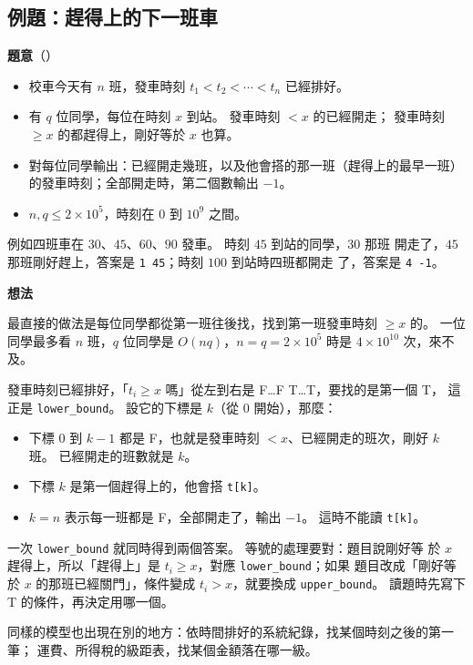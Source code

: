 \subsection{例題：趕得上的下一班車}
\label{sec:ex-next-bus}

\textbf{題意}（）

\begin{itemize}
\item 校車今天有 $n$ 班，發車時刻 $t_1 < t_2 < \cdots < t_n$ 已經排好。
\item 有 $q$ 位同學，每位在時刻 $x$ 到站。 發車時刻 $< x$ 的已經開走；
發車時刻 $\ge x$ 的都趕得上，剛好等於 $x$ 也算。
\item 對每位同學輸出：已經開走幾班，以及他會搭的那一班（趕得上的最早一班）
的發車時刻；全部開走時，第二個數輸出 $-1$。
\item $n, q \le 2 \times 10^5$，時刻在 $0$ 到 $10^9$ 之間。
\end{itemize}

例如四班車在 $30$、$45$、$60$、$90$ 發車。 時刻 $45$ 到站的同學，$30$ 那班
開走了，$45$ 那班剛好趕上，答案是 \texttt{1 45}；時刻 $100$ 到站時四班都開走
了，答案是 \texttt{4 -1}。

\textbf{想法}

最直接的做法是每位同學都從第一班往後找，找到第一班發車時刻 $\ge x$ 的。 一位
同學最多看 $n$ 班，$q$ 位同學是 $O(nq)$，$n = q = 2 \times 10^5$ 時是
$4 \times 10^{10}$ 次，來不及。

發車時刻已經排好，「$t_i \ge x$ 嗎」從左到右是 F…F T…T，要找的是第一個 T，
這正是 \texttt{lower\_bound}。 設它的下標是 $k$（從 $0$ 開始），那麼：

\begin{itemize}
\item 下標 $0$ 到 $k - 1$ 都是 F，也就是發車時刻 $< x$、已經開走的班次，剛好
$k$ 班。 已經開走的班數就是 $k$。
\item 下標 $k$ 是第一個趕得上的，他會搭 \texttt{t[k]}。
\item $k = n$ 表示每一班都是 F，全部開走了，輸出 $-1$。 這時不能讀
\texttt{t[k]}。
\end{itemize}

一次 \texttt{lower\_bound} 就同時得到兩個答案。 等號的處理要對：題目說剛好等
於 $x$ 趕得上，所以「趕得上」是 $t_i \ge x$，對應 \texttt{lower\_bound}；如果
題目改成「剛好等於 $x$ 的那班已經關門」，條件變成 $t_i > x$，就要換成
\texttt{upper\_bound}。 讀題時先寫下 T 的條件，再決定用哪一個。

同樣的模型也出現在別的地方：依時間排好的系統紀錄，找某個時刻之後的第一筆；
運費、所得稅的級距表，找某個金額落在哪一級。

